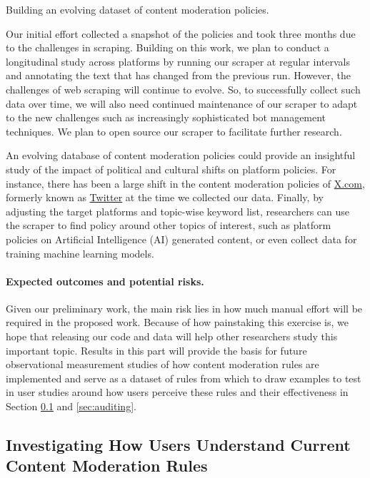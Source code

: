 \begin{task}
Building an evolving dataset of content moderation policies.
\end{task}
Our initial effort collected a snapshot of the policies and took three months due to the challenges in scraping.
Building on this work, we plan to conduct a longitudinal study across
platforms by running our scraper at regular intervals and
annotating the text that has changed from the previous run. 
However, the challenges of web scraping will continue to evolve. So, to successfully collect such data over time, we will also need continued maintenance of our scraper to adapt to the new challenges such as increasingly sophisticated bot management techniques.
We plan to open source our scraper to facilitate further research.

An evolving database of content moderation policies could provide
an insightful study of the impact of political and cultural shifts on platform
policies. For instance, there has been a large shift in the content moderation policies of \url{X.com}, formerly known as \url{Twitter} at the time we collected our data. 
Finally, by adjusting the target platforms and topic-wise keyword list, researchers can use the scraper to 
find policy around other topics of interest, such as platform policies on Artificial Intelligence (AI) generated content, or even collect data for training machine learning models.

\paragraph{Expected outcomes and potential risks.}
Given our preliminary work, the main risk lies in how much manual effort will be required in the proposed work.
Because of how painstaking this exercise is, we hope that releasing our code and data will help other researchers study this important topic.
Results in this part will
provide the basis for future observational measurement studies of how content moderation rules are implemented and serve as a dataset of rules from which to draw examples to test in user studies around how users perceive these rules and their effectiveness in Section \ref{sec:user} and \ref{sec:auditing}.


\subsection{Investigating How Users Understand Current Content Moderation Rules }
\label{sec:user}

